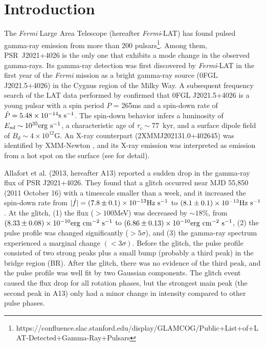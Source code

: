 \documentclass[12pt,preprint]{aastex}
\begin{document}
\keywords{}

\section{Introduction}

The \emph{Fermi} Large Area Telescope (hereafter \emph{Fermi}-LAT) has found pulsed gamma-ray emission from more than 200 pulsars\footnote{https://confluence.slac.stanford.edu/display/GLAMCOG/Public+List+of+LAT-Detected+Gamma-Ray+Pulsars}. Among them, PSR~J2021+4026 is the only one that exhibits a mode change in the observed gamma-rays.
Its gamma-ray detection was first discovered by \emph{Fermi}-LAT in the first year of the \emph{Fermi} mission \citep{abdo09a} as a bright gamma-ray source (0FGL J2021.5+4026) in the Cygnus region of the  Milky Way.
A subsequent frequency search of the LAT data performed by \citet{abdo09b} confirmed that 0FGL J2021.5+4026 is a young pulsar with a spin period $P$ = 265ms
and a spin-down rate of $\dot{P}= 5.48\times 10^{-14} {\rm s~s^{-1}}$.
The spin-down behavior infers a luminosity of $E_{sd}\sim 10^{35}{\rm erg~s^{-1}}$, a characteristic age of $\tau_c\sim77$~kyr, and a surface dipole field of $B_d\sim 4\times 10^{12}$G.
An X-ray counterpart (2XMMJ202131.0+402645) was identified by XMM-Newton \citep{trepl10}, and its X-ray emission
was interpreted as emission from a hot spot on the surface (see \citealt{Lin&Hui, Lin16} for  detail).

  Allafort et al. (2013, hereafter A13) reported a sudden drop in the gamma-ray flux of PSR J2021+4026. They found that a glitch occurred near MJD 55,850 (2011 October 16) with a timescale smaller than a week, and it increased the spin-down rate from $|\dot{f}|=(7.8\pm 0.1)\times 10^{-13}{\rm Hz~s^{-1}}$ to $(8.1\pm 0.1)\times 10^{-13}{\rm Hz~s^{-1}}$.
At the glitch, (1) the flux ($>100$MeV) was decreased by $\sim 18$\%, from $(8.33\pm0.08)\times 10^{-10}{\rm erg~cm^{-2}~s^{-1}}$ to $(6.86\pm0.13)\times 10^{-10}{\rm erg~cm^{-2}~s^{-1}}$, 
(2) the pulse profile was changed significantly ($>5\sigma$), and 
(3) the gamma-ray  spectrum experienced a marginal change $(<3\sigma)$. 
Before the glitch, the pulse profile consisted of two strong peaks plus a small bump (probably a third peak) 
in the bridge region (BR). After the glitch, there was no evidence of the third peak, and the pulse profile was well fit by two Gaussian components.
The glitch event caused the flux drop for all rotation phases, but the strongest main peak (the second peak in A13) only had a minor change in
intensity compared to other pulse phases. 
\end{document}
